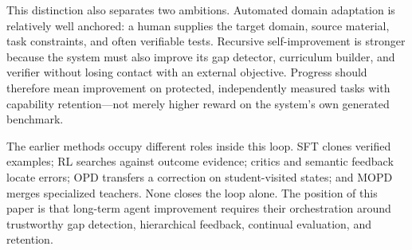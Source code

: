 This distinction also separates two ambitions. Automated domain adaptation is relatively
well anchored: a human supplies the target domain, source material, task constraints, and
often verifiable tests. Recursive self-improvement is stronger because the system must also
improve its gap detector, curriculum builder, and verifier without losing contact with an
external objective. Progress should therefore mean improvement on protected, independently
measured tasks with capability retention---not merely higher reward on the system's own
generated benchmark.

The earlier methods occupy different roles inside this loop. SFT clones verified examples;
RL searches against outcome evidence; critics and semantic feedback locate errors; OPD
transfers a correction on student-visited states; and MOPD merges specialized teachers.
None closes the loop alone. The position of this paper is that long-term agent improvement
requires their orchestration around trustworthy gap detection, hierarchical feedback,
continual evaluation, and retention.
